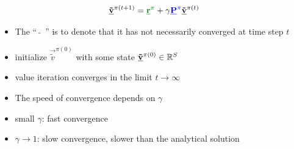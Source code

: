 \begin{frame}\frametitle{\subsubsecname}

\begin{equation}
	\vec {\tilde v}^{\pi (t+1)} = {\color{reward}\vec r^\pi} 
		+ \gamma {\color{trans}\vec P^\pi} \vec {\tilde v}^{\pi (t)} 
\end{equation}

\begin{itemize}
\item 
The ``~$\tilde{}$~'' is to denote that it has not necessarily converged 
at time step $t$
\item initialize $\vec {\tilde v}^{\pi (0)}$ with some state $\underline{\mathbf{\tilde v}}^{\pi (0)} \in \mathbb{R}^{S}$
\item value iteration converges in the limit $t \rightarrow \infty$
\item The speed of convergence depends on $\gamma$
\end{itemize}


\pause 

\begin{itemize}
\item small $\gamma$: fast convergence
\item $\gamma \rightarrow 1$: slow convergence, slower than the analytical solution
\end{itemize}

\end{frame}


